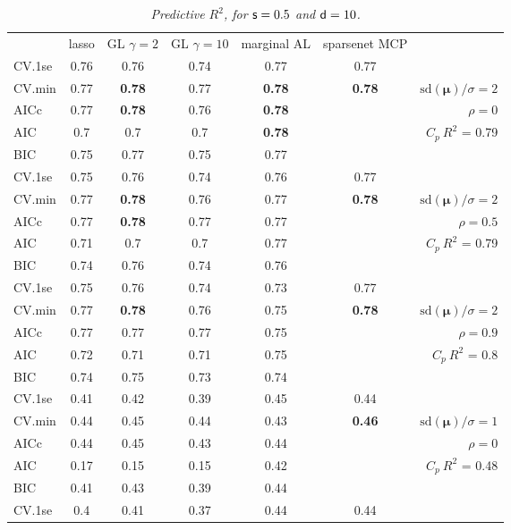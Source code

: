 \documentclass[12pt]{article}
\newcommand{\mr}[1]{\mathrm{#1}}
\newcommand{\bm}[1]{\mathbf{#1}}
\begin{document}
\begin{table}[p]\vspace{-.5cm}
\caption[l]{\label{r2}\it Predictive $R^2$, for ${\sf s}=0.5$ and  ${\sf d}=10$.}
\vspace{-.5cm}
\small{}
\begin{center}
\begin{tabular}{l*{5}{c}|r}
 & lasso & GL $\gamma=2$ & GL $\gamma=10$ & marginal AL & sparsenet MCP  &  \\
\cline{1-7}
CV.1se & 0.76 & 0.76 & 0.74 & 0.77 & 0.77 &\\
CV.min & 0.77 & {\bf 0.78} & 0.77 & {\bf 0.78} & {\bf 0.78} &  $\mr{sd}(\bm{\mu})/\sigma=2$ \\
AICc & 0.77 & {\bf 0.78} & 0.76 & {\bf 0.78} & & $\rho=0$ \\
AIC & 0.7 & 0.7 & 0.7 & {\bf 0.78} & & \multirow{2}{*}{$C_p ~ R^2$ = 0.79} \\
BIC & 0.75 & 0.77 & 0.75 & 0.77 & & \\
 \hline 
CV.1se & 0.75 & 0.76 & 0.74 & 0.76 & 0.77 &\\
CV.min & 0.77 & {\bf 0.78} & 0.76 & 0.77 & {\bf 0.78} &  $\mr{sd}(\bm{\mu})/\sigma=2$ \\
AICc & 0.77 & {\bf 0.78} & 0.77 & 0.77 & & $\rho=0.5$ \\
AIC & 0.71 & 0.7 & 0.7 & 0.77 & & \multirow{2}{*}{$C_p ~ R^2$ = 0.79} \\
BIC & 0.74 & 0.76 & 0.74 & 0.76 & & \\
 \hline 
CV.1se & 0.75 & 0.76 & 0.74 & 0.73 & 0.77 &\\
CV.min & 0.77 & {\bf 0.78} & 0.76 & 0.75 & {\bf 0.78} &  $\mr{sd}(\bm{\mu})/\sigma=2$ \\
AICc & 0.77 & 0.77 & 0.77 & 0.75 & & $\rho=0.9$ \\
AIC & 0.72 & 0.71 & 0.71 & 0.75 & & \multirow{2}{*}{$C_p ~ R^2$ = 0.8} \\
BIC & 0.74 & 0.75 & 0.73 & 0.74 & & \\
 \hline 
CV.1se & 0.41 & 0.42 & 0.39 & 0.45 & 0.44 &\\
CV.min & 0.44 & 0.45 & 0.44 & 0.43 & {\bf 0.46} &  $\mr{sd}(\bm{\mu})/\sigma=1$ \\
AICc & 0.44 & 0.45 & 0.43 & 0.44 & & $\rho=0$ \\
AIC & 0.17 & 0.15 & 0.15 & 0.42 & & \multirow{2}{*}{$C_p ~ R^2$ = 0.48} \\
BIC & 0.41 & 0.43 & 0.39 & 0.44 & & \\
 \hline 
CV.1se & 0.4 & 0.41 & 0.37 & 0.44 & 0.44 &\\

\end{tabular}
\end{center}
\end{table}
\end{document}
